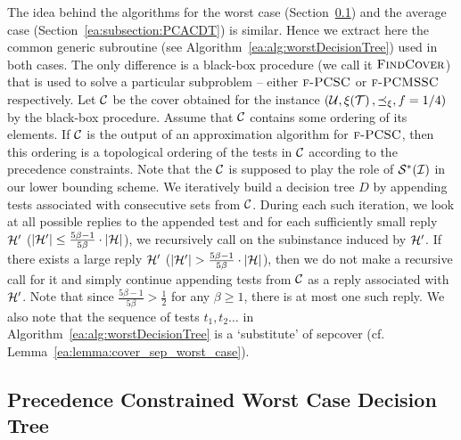 % 

\medskip
The idea behind the algorithms for the worst case (Section~\ref{ea:subsection:PCWCDT}) and the average case (Section~\ref{ea:subsection:PCACDT}) is similar.
Hence we extract here the common generic subroutine (see Algorithm~\ref{ea:alg:worstDecisionTree}) used in both cases.
The only difference is a black-box procedure (we call it $\textup{\textsc{FindCover}}{}$) that is used to solve a particular subproblem -- either $\textup{\textsc{f-PCSC}}$ or $\textup{\textsc{f-PCMSSC}}$ respectively.
Let $\mathcal{C}$ be the cover obtained for the instance $\mathopen{}\left( \mathcal{U}, \xi\mathopen{}\left( \mathcal{T} \right), \preceq_{\xi}, f=1/4 \right)$ by the black-box procedure.
Assume that $\mathcal{C}$ contains some ordering of its elements. If $\mathcal{C}$ is the output of an approximation algorithm for $\textup{\textsc{f-PCSC}}$, then this ordering is a topological ordering of the tests in $\mathcal{C}$ according to the precedence constraints.
Note that the $\mathcal{C}$ is supposed to play the role of $\mathcal{S}^*\mathopen{}\left( \mathcal{I} \right)$ in our lower bounding scheme.
We iteratively build a decision tree $D$ by appending tests associated with consecutive sets from $\mathcal{C}$.
During each such iteration, we look at all possible replies to the appended test and for each sufficiently small reply $\mathcal{H}'$ ($\mathopen{}\left| \mathcal{H}' \right| \leq \frac{5\beta-1}{5\beta}\cdot \mathopen{}\left| \mathcal{H} \right|$), we recursively call \ProcDecisionTree on the subinstance induced by $\mathcal{H}'$. If there exists a large reply $\mathcal{H}'$ ($\mathopen{}\left| \mathcal{H}' \right| > \frac{5\beta-1}{5\beta}\cdot \mathopen{}\left| \mathcal{H} \right|$), then we do not make a recursive call for it and simply continue appending tests from $\mathcal{C}$ as a reply associated with $\mathcal{H}'$. Note that since $\frac{5\beta-1}{5\beta}>\frac{1}{2}$ for any $\beta \geq 1$, there is at most one such reply.
We also note that the sequence of tests $t_1,t_2\ldots$ in Algorithm~\ref{ea:alg:worstDecisionTree} is a `substitute' of sepcover (cf. Lemma~\ref{ea:lemma:cover_sep_worst_case}).



\subsection{Precedence Constrained Worst Case Decision Tree} \label{ea:subsection:PCWCDT}

